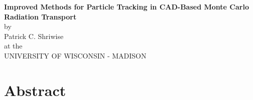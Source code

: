 \documentclass[12pt, a4paper]{article}
\author{Patrick C. Shriwise}
\date{\today}
\begin{document}
\begin{center}
  \textbf{Improved Methods for Particle Tracking in CAD-Based Monte Carlo Radiation Transport} \\
  \bigskip
  by \\
  \bigskip
  Patrick C. Shriwise \\
  \bigskip 
  at the \\
  \bigskip
  UNIVERSITY OF WISCONSIN - MADISON \\
\end{center}

\newpage
\tableofcontents 

\section{Abstract}%
\end{document}
